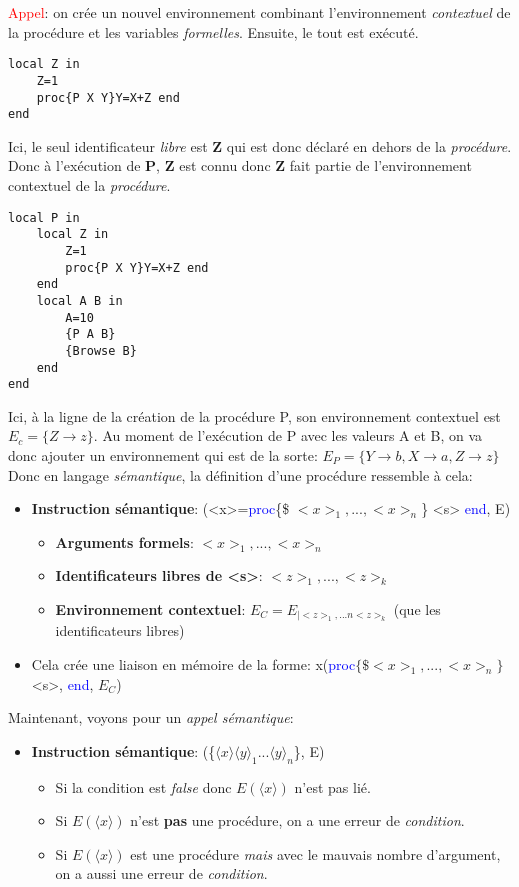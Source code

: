 \documentclass{report}
\begin{document}
\textcolor{red}{Appel}: on crée un nouvel environnement combinant l'environnement \textit{contextuel} de la procédure et les variables \textit{formelles}. Ensuite, le tout est exécuté.
\begin{lstlisting}
local Z in 
	Z=1
	proc{P X Y}Y=X+Z end
end
\end{lstlisting}
Ici, le seul identificateur \textit{libre} est \textbf{Z} qui est donc déclaré en dehors de la \textit{procédure}. Donc à l'exécution de \textbf{P}, \textbf{Z} est connu donc \textbf{Z} fait partie de l'environnement contextuel de la \textit{procédure}.
\begin{lstlisting}
local P in
	local Z in 
		Z=1
		proc{P X Y}Y=X+Z end
	end
	local A B in
		A=10
		{P A B}
		{Browse B}
	end
end 
\end{lstlisting}
Ici, à la ligne de la création de la procédure P, son environnement contextuel est $E_c = \{Z \rightarrow z\}$. Au moment de l'exécution de P avec les valeurs A et B, on va donc ajouter un environnement qui est de la sorte: $E_P = \{Y \rightarrow b, X \rightarrow a, Z \rightarrow z\}$
Donc en langage \textit{sémantique}, la définition d'une procédure ressemble à cela:
\begin{itemize}
\item \textbf{Instruction sémantique}: (<x>=\textcolor{blue}{proc}\{\$ $<x>_1, ..., <x>_n$\} <s> \textcolor{blue}{end}, E)
\begin{itemize}
\item \textbf{Arguments formels}: $<x>_1, ..., <x>_n$
\item \textbf{Identificateurs libres de <s>}: $<z>_1, ..., <z>_k$
\item \textbf{Environnement contextuel}: $E_C = E_{|<z>_1, ...n <z>_k}$ (que les identificateurs libres)
\end{itemize}
\item Cela crée une liaison en mémoire de la forme: x(\textcolor{blue}{proc}$\{\$<x>_1, ..., <x>_n\}$<s>, \textcolor{blue}{end}, $E_C$)
\end{itemize}
Maintenant, voyons pour un \textit{appel sémantique}:
\begin{itemize}
\item \textbf{Instruction sémantique}: (\{$\langle x \rangle \langle y \rangle_1 ... \langle y \rangle_n$\}, E)
\begin{itemize}
\item Si la condition est \textit{false} donc $E(\langle x \rangle)$ n'est pas lié.
\item Si $E(\langle x \rangle)$ n'est \textbf{pas} une procédure, on a une erreur de \textit{condition}.
\item Si $E(\langle x \rangle)$ est une procédure \textit{mais} avec le mauvais nombre d'argument, on a aussi une erreur de \textit{condition}.
\end{itemize}
\end{itemize}
\end{document}
